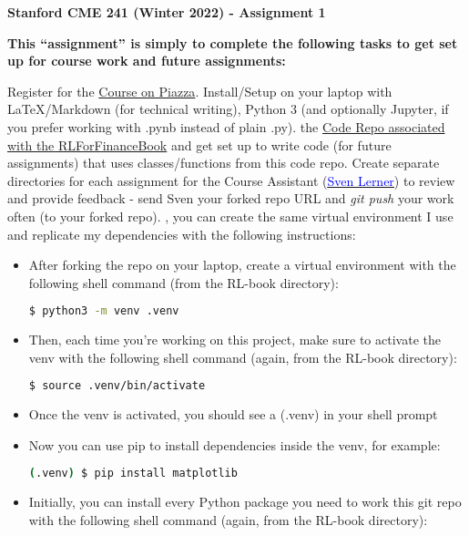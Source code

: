 \documentclass[12pt]{exam}
\begin{document}
\begin{center}
{\large {\bf Stanford CME 241 (Winter 2022) - Assignment 1}}
\end{center}
 
{\large{\bf This ``assignment'' is simply to complete the following tasks to get set up for course work and future assignments:}}
\begin{questions}
\question Register for the \href{https://piazza.com/stanford/winter2022/cme241/home}{Course on Piazza}.
\question Install/Setup on your laptop with LaTeX/Markdown (for technical writing), Python 3 (and optionally Jupyter, if you prefer working with .pynb instead of plain .py).
 the \href{https://github.com/TikhonJelvis/RL-book}{Code Repo associated with the RLForFinanceBook} and get set up to write code (for future assignments) that uses classes/functions from this code repo.
\question Create separate directories for each assignment for the Course Assistant (\href{mailto:svenl@stanford.edu}{\underline{\textcolor{blue}{Sven Lerner}}}) to review and provide feedback - send Sven your forked repo URL and {\em git push} your work often (to your forked repo).
, you can create the same virtual environment I use and replicate my dependencies with the following instructions:
\begin{itemize}
\item After forking the repo on your laptop, create a virtual environment with the following shell command (from the RL-book directory):
\begin{lstlisting}[language=bash]
$ python3 -m venv .venv
\end{lstlisting}
\item Then, each time you're working on this project, make sure to activate the venv with the following shell command (again, from the RL-book directory):
\begin{lstlisting}[language=bash]
$ source .venv/bin/activate
\end{lstlisting}
\item Once the venv is activated, you should see a (.venv) in your shell prompt
\item Now you can use pip to install dependencies inside the venv, for example:
\begin{lstlisting}[language=bash]
(.venv) $ pip install matplotlib
\end{lstlisting}
\item Initially, you can install every Python package you need to work this git repo with the following shell command (again, from the RL-book directory):

\end{itemize}
\end{questions}
\end{document}
